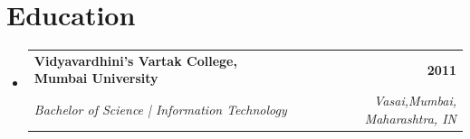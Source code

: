\documentclass[letterpaper,11pt]{article}
\makeatletter
\newcommand{\resumeItem}[1]{
  \item\small{
    {#1 \vspace{0pt}}
  }
}
\newcommand{\resumeSubheading}[4]{
  \vspace{-2pt}\item
    \begin{tabular*}{1.0\textwidth}[t]{l@{\extracolsep{\fill}}r}
      \textbf{#1} & \textbf{\small #2} \\
      \textit{\small#3} & \textit{\small #4} \\
    \end{tabular*}\vspace{-7pt}
}
\newcommand{\resumeProjectHeading}[2]{
    \item
    \begin{tabular*}{1.001\textwidth}{l@{\extracolsep{\fill}}r}
      \small#1 & \textbf{\small #2}\\
    \end{tabular*}\vspace{-7pt}
}
\newcommand{\resumeSubHeadingListStart}{\begin{itemize}[leftmargin=0.0in, label={}]}
\newcommand{\resumeSubHeadingListEnd}{\end{itemize}}\vspace{0pt}
\newcommand{\resumeItemListStart}{\begin{itemize}}
\newcommand{\resumeItemListEnd}{\end{itemize}\vspace{-5pt}}
\makeatother
\begin{document}

\section{Education} 
\vspace{2pt}
  \resumeSubHeadingListStart
    \resumeSubheading
      {Vidyavardhini's Vartak College, Mumbai University}{2011}
      {Bachelor of Science | Information Technology
      }{Vasai,Mumbai, Maharashtra, IN}
  \resumeSubHeadingListEnd
\vspace{-12pt}
\end{document}
